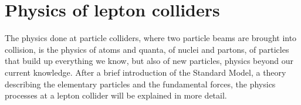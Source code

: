 \chapter{Physics of lepton colliders}
\label{Lepton_Physics}
\begin{chapterabstract}
The physics done at particle colliders, where two particle beams are brought into collision, is the physics of atoms and quanta, of nuclei and partons, of particles that build up everything we know, but also of new particles, physics beyond our current knowledge.
After a brief introduction of the Standard Model, a theory describing the elementary particles and the fundamental forces, the physics processes at a lepton collider will be explained in more detail.
\end{chapterabstract}
\newline

